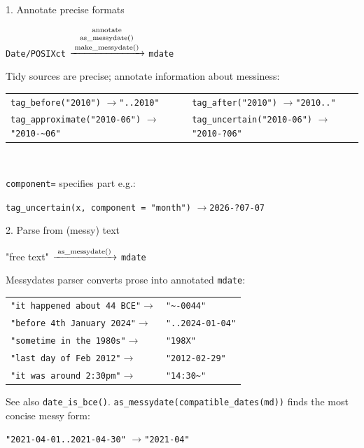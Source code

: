 \documentclass[9pt]{extarticle}
\let\code\verb
\newcommand{\arrow}{\;\textcolor{mddark}{$\rightarrow$}\;}
\newcommand{\pipe}[1]{\;\textcolor{mddark}{$\xrightarrow{\;\text{\scriptsize #1}\;}$}\;}
\begin{document}
\begin{minipage}[t]{0.323\textwidth}
\begin{mdbox}{1. Annotate precise formats}
\begin{center}
\code|Date/POSIXct| \pipe{\shortstack[c]{annotate \\ as\_messydate() \\ make\_messydate()}} \code|mdate|\\[2pt]
\end{center}
Tidy sources are precise; annotate information about messiness:
\vspace{-10pt}
\begin{center}
\renewcommand{\arraystretch}{1.12}
\begin{tabular}{@{}ll@{}}
\code|tag_before("2010")| \arrow \code|"..2010"| &
\code|tag_after("2010")| \arrow \code|"2010.."|\\
\code|tag_approximate("2010-06")| \arrow \code|"2010-~06"| &
\code|tag_uncertain("2010-06")| \arrow \code|"2010-?06"|\\
\end{tabular}\\[2pt]
\end{center}
\code|component=| specifies part e.g.:
\begin{center}
\code|tag_uncertain(x, component = "month")| \arrow \code|2026-?07-07|
\end{center}
\end{mdbox}

\begin{mdbox}{2. Parse from (messy) text}
\begin{center}
"free text" \pipe{as\_messydate()} \code|mdate|\\[2pt]
\end{center}
Messydates parser converts prose into annotated \code|mdate|:

\smallskip
\begin{center}
\renewcommand{\arraystretch}{1.12}
\begin{tabular}{@{}ll@{}}
\code|"it happened about 44 BCE"|\arrow          & \code|"~-0044"|\\
\code|"before 4th January 2024"|\arrow   & \code|"..2024-01-04"|\\
\code|"sometime in the 1980s"|\arrow               & \code|"198X"|\\
\code|"last day of Feb 2012"|\arrow   & \code|"2012-02-29"|\\
\code|"it was around 2:30pm"|\arrow   & \code|"14:30~"|\\
\end{tabular}
\end{center}

See also \code|date_is_bce()|.
\code|as_messydate(compatible_dates(md))| finds the most concise messy form:\\[-12pt]
\begin{center}
\code|"2021-04-01..2021-04-30"| \arrow \code|"2021-04"|
\end{center}
\end{mdbox}
\end{minipage}\hfill
\end{document}
